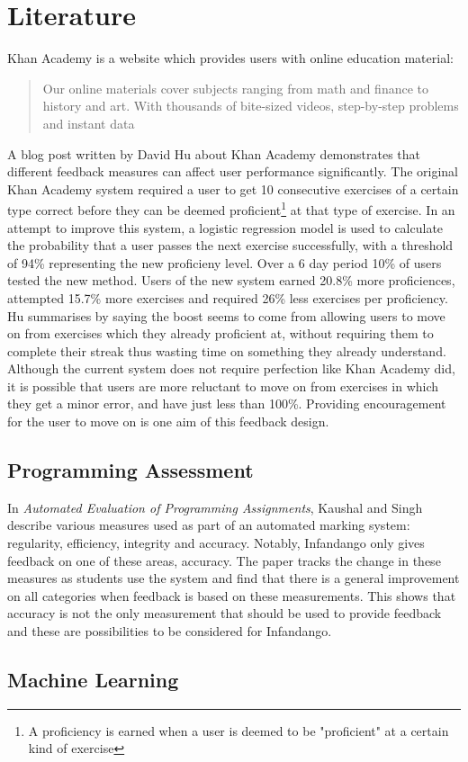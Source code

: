 \section{Literature}
Khan Academy\cite{khan_site} is a website which provides users with online education material:
\begin{quote}
Our online materials cover subjects ranging from math and finance to history and art.  With thousands of bite-sized videos, step-by-step problems and instant data\cite{ka_faq}
\end{quote}
A blog post\cite{khan_blog} written by David Hu about Khan Academy demonstrates that different feedback measures can affect user performance significantly. The original Khan Academy system required a user to get 10 consecutive exercises of a certain type correct before they can be deemed proficient\footnote{
A proficiency is earned when a user is deemed to be "proficient" at a certain kind of exercise
} at that type of exercise. In an attempt to improve this system, a logistic regression model is used to calculate the probability that a user passes the next exercise successfully, with a threshold of 94\% representing the new proficieny level. Over a 6 day period 10\% of users tested the new method. Users of the new system earned 20.8\% more proficiences, attempted 15.7\% more exercises and required 26\% less exercises per proficiency. Hu summarises by saying the boost seems to come from allowing users to move on from exercises which they already proficient at, without requiring them to complete their streak thus wasting time on something they already understand.
Although the current system does not require perfection like Khan Academy did, it is possible that users are more reluctant to move on from exercises in which they get a minor error, and have just less than 100\%. Providing encouragement for the user to move on is one aim of this feedback design.
\subsection{Programming Assessment}
In {\it Automated Evaluation of Programming Assignments}\cite{automate_evaluation}, Kaushal and Singh describe various measures used as part of an automated marking system: regularity, efficiency, integrity and accuracy. Notably, Infandango only gives feedback on one of these areas, accuracy. The paper tracks the change in these measures as students use the system and find that there is a general improvement on all categories when feedback is based on these measurements. This shows that accuracy is not the only measurement that should be used to provide feedback and these are possibilities to be considered for Infandango.
\subsection{Machine Learning}
